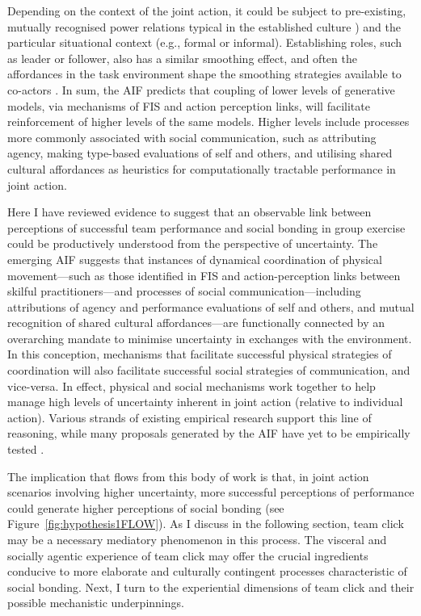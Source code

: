 \begin{CJK}{UTF8}{gbsn}
Depending on the context of the joint action, it could be subject to pre-existing, mutually recognised power relations typical in the established culture \citep[e.g., favouring hierarchical or egalitarian communication, see][]{Cheon2011}) and the particular situational context (e.g., formal or informal).  Establishing roles, such as leader or follower, also has a similar smoothing effect, and often the affordances in the task environment shape the smoothing strategies available to co-actors \citep{Marsh2009}.  In sum, the AIF predicts that coupling of lower levels of generative models, via mechanisms of FIS and action perception links, will facilitate reinforcement of higher levels of the same models.  Higher levels include processes more commonly associated with social communication, such as attributing agency, making type-based evaluations of self and others, and utilising shared cultural affordances as heuristics for computationally tractable performance in joint action.

Here I have reviewed evidence to suggest that an observable link between perceptions of successful team performance and social bonding in group exercise could be productively understood from the perspective of uncertainty.  The emerging AIF suggests that instances of dynamical coordination of physical movement---such as those identified in FIS and action-perception links between skilful practitioners---and processes of social communication---including attributions of agency and performance evaluations of self and others, and mutual recognition of shared cultural affordances---are functionally connected by an overarching mandate to minimise uncertainty in exchanges with the environment.  In this conception, mechanisms that facilitate successful physical strategies of coordination will also facilitate successful social strategies of communication, and vice-versa.  In effect, physical and social mechanisms work together to help manage high levels of uncertainty inherent in joint action (relative to individual action).  Various strands of existing empirical research support this line of reasoning, while many proposals generated by the AIF have yet to be empirically tested \citep{Pickering2014,Clark2015}.

The implication that flows from this body of work is that, in joint action scenarios involving higher uncertainty, more successful perceptions of performance could generate higher perceptions of social bonding (see Figure~\ref{fig:hypothesis1FLOW}).  As I discuss in the following section, team click may be a necessary mediatory phenomenon in this process.  The visceral and socially agentic experience of team click may offer the crucial ingredients conducive to more elaborate and culturally contingent processes characteristic of social bonding. Next, I turn to the experiential dimensions of team click and their possible mechanistic underpinnings.


\end{CJK}
